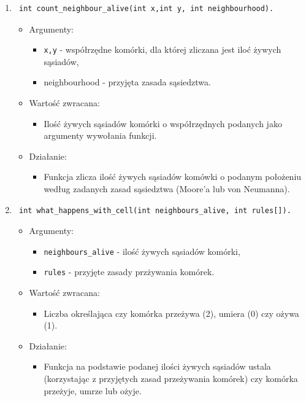 \documentclass[a4paper,11pt, notitlepage ]{article}
\begin{document}
\begin{enumerate}
\item \begin{verbatim} int count_neighbour_alive(int x,int y, int neighbourhood). \end{verbatim}
\begin{itemize}
\item Argumenty:
\begin{itemize}
\item \verb+x,y+ - współrzędne komórki, dla której zliczana jest iloć żywych sąsiadów,
\item neighbourhood - przyjęta zasada sąsiedztwa.
\end{itemize}
\item Wartość zwracana:
\begin{itemize}
\item Ilość żywych sąsiadów komórki o współrzędnych podanych jako argumenty wywołania funkcji.
\end{itemize}
\item Działanie:
\begin{itemize}
\item Funkcja zlicza ilość żywych sąsiadów komówki o podanym położeniu według zadanych zasad sąsiedztwa (Moore'a lub von Neumanna).
\end{itemize}
\end{itemize}

\item \begin{verbatim} int what_happens_with_cell(int neighbours_alive, int rules[]). \end{verbatim}
\begin{itemize}
\item Argumenty:
\begin{itemize}
\item \verb+neighbours_alive+ - ilość żywych sąsiadów komórki,
\item \verb+rules+ - przyjęte zasady przżywania komórek.
\end{itemize}
\item Wartość zwracana:
\begin{itemize}
\item Liczba określająca czy komórka przeżywa (2), umiera (0) czy ożywa (1).
\end{itemize}
\item Działanie:
\begin{itemize}
\item Funkcja na podstawie podanej ilości żywych sąsiadów ustala (korzystając z przyjętych zasad przeżywania komórek) czy komórka przeżyje, umrze lub ożyje.
\end{itemize}
\end{itemize}

\end{enumerate}
\end{document}
